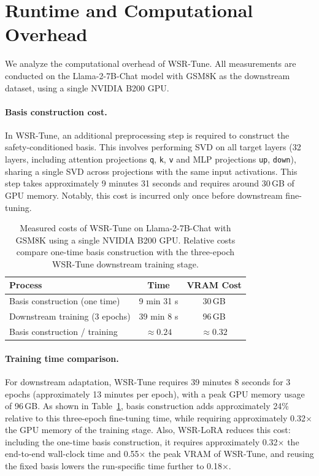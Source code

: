 \documentclass{article}
\newcommand{\kms}[1]{{\leavevmode\color{blue}[MS: #1]}}
\begin{document}
\section{Runtime and Computational Overhead}
\label{app:runtime}
We analyze the computational overhead of WSR-Tune. All measurements are conducted on the Llama-2-7B-Chat model with GSM8K as the downstream dataset, using a single NVIDIA B200 GPU.

\paragraph{Basis construction cost.}
In WSR-Tune, an additional preprocessing step is required to construct the safety-conditioned basis. This involves performing SVD on all target layers (32 layers, including attention projections \texttt{q}, \texttt{k}, \texttt{v} and MLP projections \texttt{up}, \texttt{down}), sharing a single SVD across projections with the same input activations. This step takes approximately 9 minutes 31 seconds and requires around 30\,GB of GPU memory. Notably, this cost is incurred only once before downstream fine-tuning.


\begin{table}[htbp]
\centering
\caption{Measured costs of WSR-Tune on Llama-2-7B-Chat with GSM8K using a single NVIDIA B200 GPU. Relative costs compare one-time basis construction with the three-epoch WSR-Tune downstream training stage.}
\label{tab:runtime_cost}
\begin{tabular}{lcc}
\toprule
Process & Time & VRAM Cost \\
\midrule
Basis construction (one time) & 9 min 31 s & 30\,GB \\
Downstream training (3 epochs) & 39 min 8 s & 96\,GB \\
Basis construction / training & $\approx 0.24$ & $\approx 0.32$ \\
\bottomrule
\end{tabular}
\end{table}

\paragraph{Training time comparison.}
For downstream adaptation, WSR-Tune requires 39 minutes 8 seconds for 3 epochs (approximately 13 minutes per epoch), with a peak GPU memory usage of 96\,GB. As shown in Table~\ref{tab:runtime_cost}, basis construction adds approximately 24\% relative to this three-epoch fine-tuning time, while requiring approximately 0.32$\times$ the GPU memory of the training stage. Also, WSR-LoRA reduces this cost: including the one-time basis construction, it requires approximately 0.32× the end-to-end wall-clock time and 0.55× the peak VRAM of WSR-Tune, and reusing the fixed basis lowers the run-specific time further to 0.18×. 
\end{document}
